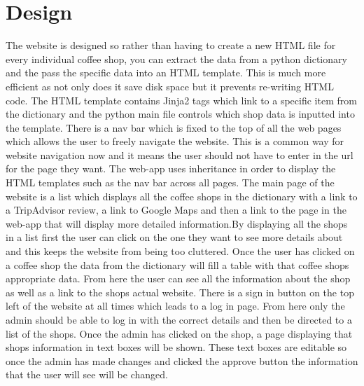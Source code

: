 \documentclass[10pt, a4paper]{article}
\begin{document}
    \section{Design}
        The website is designed so rather than having to create a new HTML file for every individual coffee shop, you can extract the data from a python dictionary and the pass the specific data into an HTML template.  This is much more efficient as not only does it save disk space but it prevents re-writing HTML code. The HTML template contains Jinja2 tags which link to a specific item from the dictionary and the python main file controls which shop data is inputted into the template.
        There is a nav bar which is fixed to the top of all the web pages which allows the user to freely navigate the website.  This is a common way for website navigation now and it means the user should not have to enter in the url for the page they want. The web-app uses inheritance in order to display the HTML templates such as the nav bar across all pages. The main page of the website is a list which displays all the coffee shops in the dictionary with a link to a TripAdvisor review, a link to Google Maps and then a link to the page in the web-app that will display more detailed information.By displaying all the shops in a list first the user can click on the one they want to see more details about and this keeps the website from being too cluttered.  Once the user has clicked on a coffee shop the data from the dictionary will fill a table with that coffee shops appropriate data.  From here the user can see all the information about the shop as well as a link to the shops actual website.  There is a sign in button on the top left of the website at all times which leads to a log in page.  From here only the admin should be able to log in with the correct details and then be directed to a list of the shops.  Once the admin has clicked on the shop, a page displaying that shops information in text boxes will be shown.  These text boxes are editable so once the admin has made changes and clicked the approve button the information that the user will see will be changed.     
        
        
	
\end{document}
